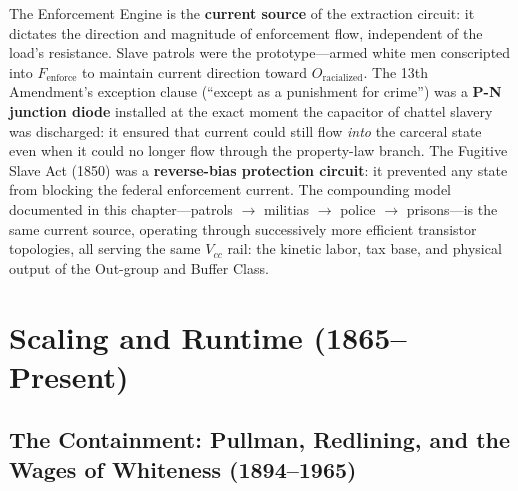 \begin{keyinsight}
The Enforcement Engine is the \textbf{current source} of the extraction circuit: it dictates the direction and magnitude of enforcement flow, independent of the load's resistance. Slave patrols were the prototype---armed white men conscripted into $F_{\text{enforce}}$ to maintain current direction toward $O_{\text{racialized}}$. The 13th Amendment's exception clause (``except as a punishment for crime'') was a \textbf{P-N junction diode} installed at the exact moment the capacitor of chattel slavery was discharged: it ensured that current could still flow \emph{into} the carceral state even when it could no longer flow through the property-law branch. The Fugitive Slave Act (1850) was a \textbf{reverse-bias protection circuit}: it prevented any state from blocking the federal enforcement current. The compounding model documented in this chapter---patrols $\rightarrow$ militias $\rightarrow$ police $\rightarrow$ prisons---is the same current source, operating through successively more efficient transistor topologies, all serving the same $V_{cc}$ rail: the kinetic labor, tax base, and physical output of the Out-group and Buffer Class.
\end{keyinsight}

\part{Scaling and Runtime (1865--Present)}
\label{part:runtime}

\chapter{The Containment: Pullman, Redlining, and the Wages of Whiteness (1894--1965)}
\label{ch:containment}

